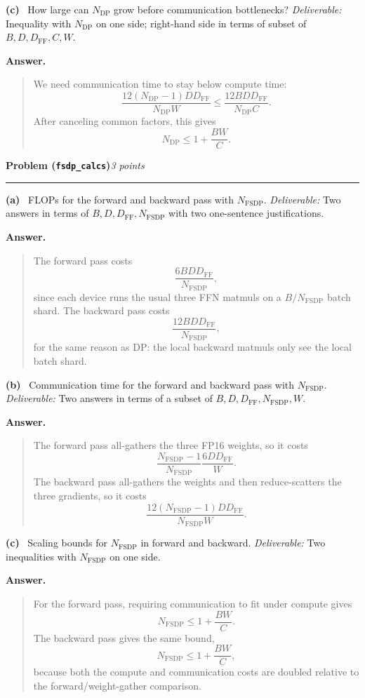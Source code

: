 \documentclass[11pt]{article}
\newcommand{\problem}[2]{%
  \vspace{0.6em}%
  \noindent\textbf{Problem (\texttt{#1})}\hfill\textit{#2 points}\par%
  \vspace{0.2em}\hrule\vspace{0.4em}%
}
\newcommand{\subq}[1]{\vspace{0.3em}\noindent\textbf{(#1)}\ }
\newcommand{\deliverable}[1]{\vspace{0.2em}\noindent\textit{Deliverable:} #1\par}
\newenvironment{answer}{%
  \vspace{0.3em}%
  \noindent\textbf{Answer.}\begin{quote}%
}{%
  \end{quote}\vspace{0.4em}%
}
\begin{document}
\subq{c} How large can $N_{\mathrm{DP}}$ grow before communication bottlenecks?
\deliverable{Inequality with $N_{\mathrm{DP}}$ on one side; right-hand side in terms of subset of $B, D, D_{\mathrm{FF}}, C, W$.}
\begin{answer}
  We need communication time to stay below compute time:
  \[
    \frac{12 (N_{\mathrm{DP}}-1) D D_{\mathrm{FF}}}{N_{\mathrm{DP}} W}
    \le
    \frac{12 B D D_{\mathrm{FF}}}{N_{\mathrm{DP}} C}.
  \]
  After canceling common factors, this gives
  \[
    N_{\mathrm{DP}} \le 1 + \frac{B W}{C}.
  \]
\end{answer}


\problem{fsdp\_calcs}{3}

\subq{a} FLOPs for the forward and backward pass with $N_{\mathrm{FSDP}}$.
\deliverable{Two answers in terms of $B, D, D_{\mathrm{FF}}, N_{\mathrm{FSDP}}$ with two one-sentence justifications.}
\begin{answer}
  The forward pass costs
  \[
    \frac{6 B D D_{\mathrm{FF}}}{N_{\mathrm{FSDP}}},
  \]
  since each device runs the usual three FFN matmuls on a \(B/N_{\mathrm{FSDP}}\) batch shard. The backward pass costs
  \[
    \frac{12 B D D_{\mathrm{FF}}}{N_{\mathrm{FSDP}}},
  \]
  for the same reason as DP: the local backward matmuls only see the local batch shard.
\end{answer}

\subq{b} Communication time for the forward and backward pass with $N_{\mathrm{FSDP}}$.
\deliverable{Two answers in terms of a subset of $B, D, D_{\mathrm{FF}}, N_{\mathrm{FSDP}}, W$.}
\begin{answer}
  The forward pass all-gathers the three FP16 weights, so it costs
  \[
    \frac{N_{\mathrm{FSDP}}-1}{N_{\mathrm{FSDP}}}\frac{6 D D_{\mathrm{FF}}}{W}.
  \]
  The backward pass all-gathers the weights and then reduce-scatters the three gradients, so it costs
  \[
    \frac{12 (N_{\mathrm{FSDP}}-1) D D_{\mathrm{FF}}}{N_{\mathrm{FSDP}} W}.
  \]
\end{answer}

\subq{c} Scaling bounds for $N_{\mathrm{FSDP}}$ in forward and backward.
\deliverable{Two inequalities with $N_{\mathrm{FSDP}}$ on one side.}
\begin{answer}
  For the forward pass, requiring communication to fit under compute gives
  \[
    N_{\mathrm{FSDP}} \le 1 + \frac{B W}{C}.
  \]
  The backward pass gives the same bound,
  \[
    N_{\mathrm{FSDP}} \le 1 + \frac{B W}{C},
  \]
  because both the compute and communication costs are doubled relative to the forward/weight-gather comparison.
\end{answer}
\end{document}
